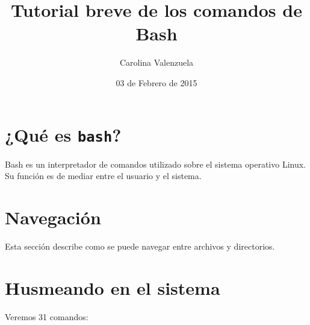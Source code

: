 \documentclass[12pt]{article}
\title{Tutorial breve de los comandos de Bash}
\author{Carolina Valenzuela}
\date{03 de Febrero de 2015}
\begin{document}
\maketitle
\section{¿Qué es {\tt bash}?}
Bash es un interpretador de comandos utilizado sobre el sistema operativo Linux.
Su función es de mediar entre el usuario y el sistema.
\section{Navegación}
Esta sección describe como se puede navegar entre archivos y directorios.
\section{Husmeando en el sistema}
Veremos 31 comandos:
\end{document}
